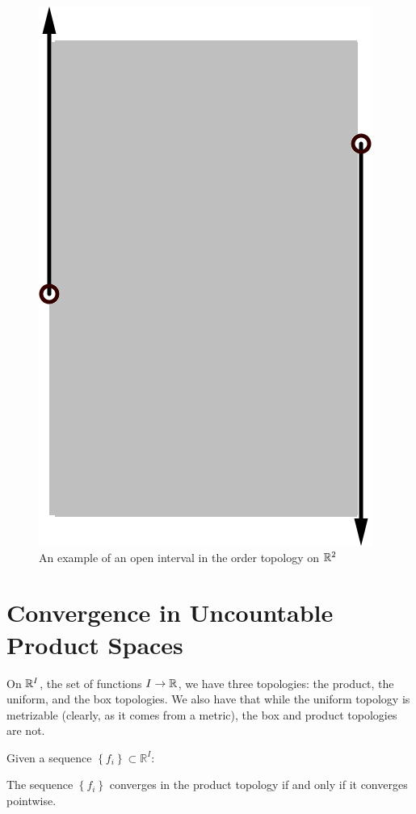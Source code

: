 \begin{figure}[!htb]
	\centering
	\includegraphics[scale=.2]{images/ordertopr2}
	\caption{An example of an open interval in the order topology on $\mathbb{R}^2$}
	\label{fig:ordtopr2}
\end{figure}

\section*{Convergence in Uncountable Product Spaces}

On $\mathbb{R}^I$, the set of functions $I\rightarrow \mathbb{R}$, we have three topologies: the product, the uniform, and the box topologies.  We also have that while the uniform topology is metrizable (clearly, as it comes from a metric), the box and product topologies are not.

Given a sequence $\left\{f_i\right\}\subset \mathbb{R}^I$:

The sequence $\left\{f_i\right\}$ converges in the product topology if and only if it converges pointwise.

